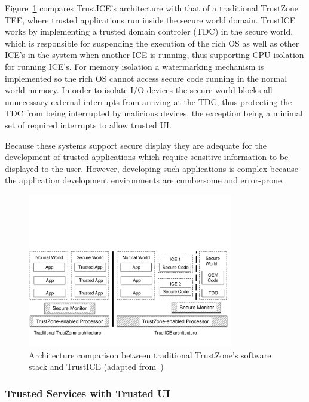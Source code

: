 Figure~\ref{fig:trustICE_architecture} compares TrustICE's architecture with that of a traditional TrustZone TEE, where trusted applications run inside the secure world domain. TrustICE works by implementing a trusted domain controler (TDC) in the secure world, which is responsible for suspending the execution of the rich OS as well as other ICE's in the system when another ICE is running, thus supporting CPU isolation for running ICE's. For memory isolation a watermarking mechanism is implemented so the rich OS cannot access secure code running in the normal world memory. In order to isolate I/O devices the secure world blocks all unnecessary external interrupts from arriving at the TDC, thus protecting the TDC from being interrupted by malicious devices, the exception being a minimal set of required interrupts to allow trusted UI.

Because these systems support secure display they are adequate for the development of trusted applications which require sensitive information to be displayed to the user. However, developing such applications is complex because the application development environments are cumbersome and error-prone.


\begin{figure}[t!]
	\centering
	\includegraphics[width=0.80\textwidth]{img/trustICE.pdf}
	\caption{Architecture comparison between traditional TrustZone's software stack and TrustICE (adapted from~\cite{sun2015trustice})}
	\label{fig:trustICE_architecture}
\end{figure}

\subsubsection{Trusted Services with Trusted UI}

